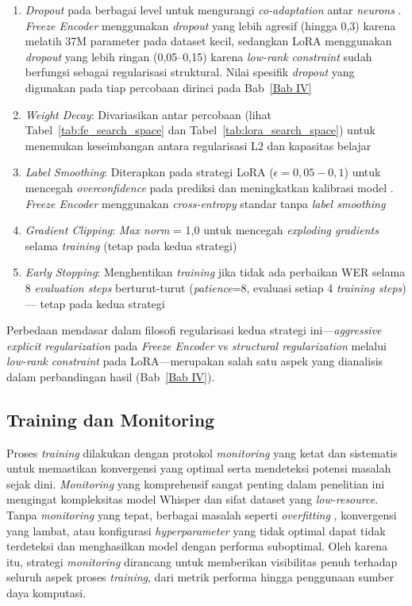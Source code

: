 \begin{enumerate}[noitemsep]
    \item \textit{Dropout} pada berbagai level untuk mengurangi \textit{co-adaptation} antar \textit{neurons} \cite{srivastava2014dropout}. \textit{Freeze Encoder} menggunakan \textit{dropout} yang lebih agresif (hingga 0,3) karena melatih 37M parameter pada dataset kecil, sedangkan LoRA menggunakan \textit{dropout} yang lebih ringan (0,05--0,15) karena \textit{low-rank constraint} sudah berfungsi sebagai regularisasi struktural. Nilai spesifik \textit{dropout} yang digunakan pada tiap percobaan dirinci pada Bab~\ref{Bab IV}
    \item \textit{Weight Decay}: Divariasikan antar percobaan (lihat Tabel~\ref{tab:fe_search_space} dan Tabel~\ref{tab:lora_search_space}) untuk menemukan keseimbangan antara regularisasi L2 dan kapasitas belajar
    \item \textit{Label Smoothing}: Diterapkan pada strategi LoRA ($\epsilon = 0,05{-}0,1$) untuk mencegah \textit{overconfidence} pada prediksi dan meningkatkan kalibrasi model \cite{szegedy2016rethinking}. \textit{Freeze Encoder} menggunakan \textit{cross-entropy} standar tanpa \textit{label smoothing}
    \item \textit{Gradient Clipping}: \textit{Max norm} = 1,0 untuk mencegah \textit{exploding gradients} selama \textit{training} \cite{pascanu2013difficulty} (tetap pada kedua strategi)
    \item \textit{Early Stopping}: Menghentikan \textit{training} jika tidak ada perbaikan WER selama 8 \textit{evaluation steps} berturut-turut (\textit{patience}=8, evaluasi setiap 4 \textit{training steps}) --- tetap pada kedua strategi
\end{enumerate}

Perbedaan mendasar dalam filosofi regularisasi kedua strategi ini---\textit{aggressive explicit regularization} pada \textit{Freeze Encoder} vs \textit{structural regularization} melalui \textit{low-rank constraint} pada LoRA---merupakan salah satu aspek yang dianalisis dalam perbandingan hasil (Bab~\ref{Bab IV}).

\subsection{Training dan Monitoring}
\label{III.Langkah7}

Proses \textit{training} dilakukan dengan protokol \textit{monitoring} yang ketat dan sistematis untuk memastikan konvergensi yang optimal serta mendeteksi potensi masalah sejak dini. \textit{Monitoring} yang komprehensif sangat penting dalam penelitian ini mengingat kompleksitas model Whisper dan sifat dataset yang \textit{low-resource}. Tanpa \textit{monitoring} yang tepat, berbagai masalah seperti \textit{overfitting} \cite{srivastava2014dropout}, konvergensi yang lambat, atau konfigurasi \textit{hyperparameter} yang tidak optimal dapat tidak terdeteksi dan menghasilkan model dengan performa suboptimal. Oleh karena itu, strategi \textit{monitoring} dirancang untuk memberikan visibilitas penuh terhadap seluruh aspek proses \textit{training}, dari metrik performa hingga penggunaan sumber daya komputasi.

